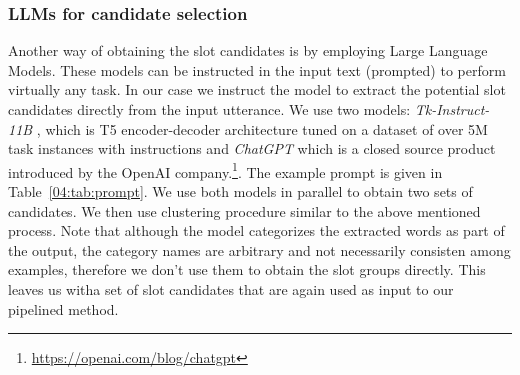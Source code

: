\subsubsection{LLMs for candidate selection}
Another way of obtaining the slot candidates is by employing Large Language Models.
These models can be instructed in the input text (prompted) to perform virtually any task.
In our case we instruct the model to extract the potential slot candidates directly from the input utterance.
We use two models: \emph{Tk-Instruct-11B} \cite{supernaturalinstructions}, which is T5 encoder-decoder architecture \cite{2020t5} tuned on a dataset of over 5M task instances with instructions and \emph{ChatGPT} which is a closed source product introduced by the OpenAI company.\footnote{\url{https://openai.com/blog/chatgpt}}.
The example prompt is given in Table~\ref{04:tab:prompt}.
We use both models in parallel to obtain two sets of candidates.
We then use clustering procedure similar to the above mentioned process.
Note that although the model categorizes the extracted words as part of the output, the category names are arbitrary and not necessarily consisten among examples, therefore we don't use them to obtain the slot groups directly.
This leaves us witha  set of slot candidates that are again used as input to our pipelined method.

